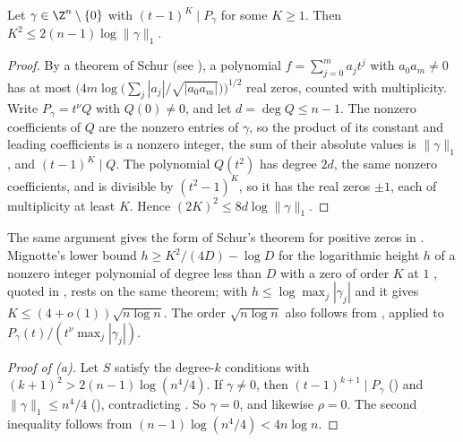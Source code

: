 \begin{lemma}[Schur's bound at $t=1$]
\label{lem:schur}
Let $\gamma\in\Z^{n}\setminus\{0\}$ with $(t-1)^{K}\mid P_\gamma$ for some $K\ge1$.  Then $K^{2}\le 2(n-1)\log\|\gamma\|_1$.
\end{lemma}

\begin{proof}
By a theorem of Schur \cite{schur1933} (see \cite[(1.4)]{erdosturan1950}), a polynomial $f=\sum_{j=0}^ma_jt^j$ with $a_0a_m\ne0$ has at most $\bigl(4m\log\bigl(\sum_j|a_j|/\sqrt{|a_0a_m|}\bigr)\bigr)^{1/2}$ real zeros, counted with multiplicity.
Write $P_\gamma=t^{\nu}Q$ with $Q(0)\ne0$, and let $d=\deg Q\le n-1$.
The nonzero coefficients of $Q$ are the nonzero entries of $\gamma$, so the product of its constant and leading coefficients is a nonzero integer, the sum of their absolute values is $\|\gamma\|_1$, and $(t-1)^K\mid Q$.
The polynomial $Q(t^2)$ has degree $2d$, the same nonzero coefficients, and is divisible by $(t^2-1)^K$, so it has the real zeros $\pm1$, each of multiplicity at least $K$.
Hence $(2K)^2\le8d\log\|\gamma\|_1$.
\end{proof}

The same argument gives the form of Schur's theorem for positive zeros in \cite[Thm.~A]{BEK1999}.
Mignotte's lower bound $h\ge K^2/(4D)-\log D$ for the logarithmic height $h$ of a nonzero integer polynomial of degree less than $D$ with a zero of order $K$ at $1$ \cite{mignotte1982}, quoted in \cite[Sect.~1]{amoroso1995}, rests on the same theorem; with $h\le\log\max_j|\gamma_j|$ and  it gives $K\le(4+o(1))\sqrt{n\log n}$.
The order $\sqrt{n\log n}$ also follows from \cite[Thms.~2.1 and 2.8]{BEK1999}, applied to $P_\gamma(t)/(t^{\nu}\max_j|\gamma_j|)$.

\begin{proof}[Proof of (a)]
Let $S$ satisfy the degree-$k$ conditions with $(k+1)^2>2(n-1)\log(n^4/4)$.
If $\gamma\ne0$, then $(t-1)^{k+1}\mid P_\gamma$ () and $\|\gamma\|_1\le n^4/4$ (), contradicting .
So $\gamma=0$, and likewise $\rho=0$.
The second inequality follows from $(n-1)\log(n^4/4)<4n\log n$.
\end{proof}

